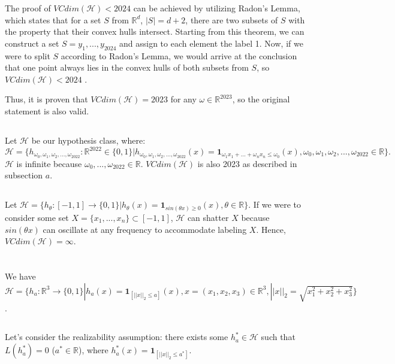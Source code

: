 \documentclass{article}
\newcounter{theorem}
\begin{document}
The proof of $VCdim(\mathcal{H}) < 2024$ can be achieved by utilizing Radon's Lemma, which states that for a set $S$ from $\mathbb{R}^d$, $|S|=d+2$, there are two subsets of $S$ with the property that their convex hulls intersect. Starting from this theorem, we can construct a set $S={y_1,...,y_{2024}}$ and assign to each element the label 1. Now, if we were to split $S$ according to Radon's Lemma, we would arrive at the conclusion that one point always lies in the convex hulls of both subsets from $S$, so $VCdim(\mathcal{H}) < 2024$ \cite{vcdim2023}.

Thus, it is proven that $VCdim(\mathcal{H})=2023$ for any $\omega\in\mathbb{R}^{2023}$, so the original statement is also valid.
\subsection{}
Let $\mathcal{H}$ be our hypothesis class, where:
$
\mathcal{H}=\{h_{\omega_0, \omega_1,\omega_2,...,\omega_{2022}}:\mathbb{R}^{2022}\in\{0,1\}|h_{\omega_0, \omega_1,\omega_2,...,\omega_{2022}}(x) = \mathbf{1}_{\omega_1x_1 + ... + \omega_nx_n \leq \omega_0}(x), \omega_0, \omega_1,\omega_2,...,\omega_{2022}\in \mathbb{R}\}.
$
$\mathcal{H}$ is infinite because $\omega_0,...,\omega_{2022}\in\mathbb{R}$. $VCdim(\mathcal{H})$ is also 2023 as described in subsection $a$.
\subsection{}
Let $\mathcal{H}=\{ h_\theta:[-1,1]\rightarrow\{0,1\}|h_\theta(x)=\mathbf{1}_{sin(\theta x) \geq 0}(x), \theta \in \mathbb{R}\}$. If we were to consider some set $X=\{x_1,...,x_n\}\subset[-1,1]$, $\mathcal{H}$ can shatter $X$ because $sin(\theta x)$ can oscillate at any frequency to accommodate labeling $X$. Hence, $VCdim(\mathcal{H})=\infty$. 

\section{}
We have $\mathcal{H}=\{ h_a:\mathbb{R}^3\rightarrow \{0,1\}|h_a(x)=\mathbf{1}_{[||x||_2\leq a]}(x), x=(x_1,x_2,x_3)\in\mathbb{R}^3, ||x||_2 = \sqrt{x_1^2+x_2^2+x_3^2} \}$.
\subsection{}
Let's consider the realizability assumption: there exists some $h_a^*\in\mathcal{H}$ such that $L(h_a^*)=0$ ($a^*\in\mathbb{R}$), where $h_a^*(x)=\mathbf{1}_{[||x||_2\leq a^*]}$.
\end{document}
